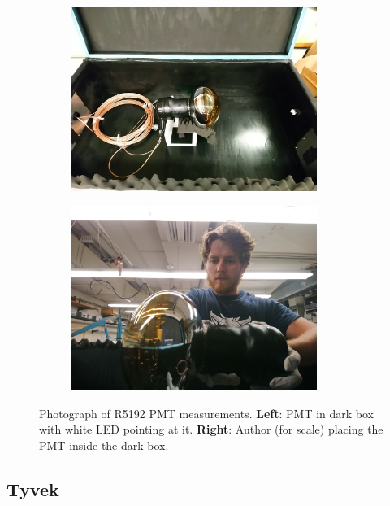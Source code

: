\begin{figure}[!htbp]
\begin{subfigure}{.5\textwidth}
  \centering
  \includegraphics[height=6cm, width=\linewidth]{Figures/OD_PMTs/od_pmt_in_dark_box.JPG}
  \end{subfigure}
  \begin{subfigure}{.5\textwidth}
  \centering
  \includegraphics[height=6cm, width=\linewidth]{Figures/OD_PMTs/sam_holding_od_pmt.JPG}
  \end{subfigure}
\caption{Photograph of R5192 PMT measurements. \textbf{Left}: PMT in dark box with white LED pointing at it. \textbf{Right}: Author (for scale) placing the PMT inside the dark box.}
\label{fig:od_pmt_brandeis_measurements}
\end{figure}


\subsection{Tyvek}
\fi